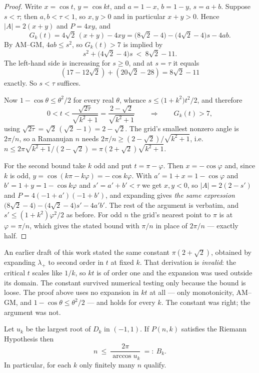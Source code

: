 \begin{proof}
Write $x=\cos t$, $y=\cos kt$, and $a=1-x$, $b=1-y$, $s=a+b$. Suppose
$s<\tau$; then $a,b<\tau<1$, so $x,y>0$ and in particular $x+y>0$. Hence
$|A|=2(x+y)$ and $P=4xy$, and
\[
  G_k(t)=4\sqrt2\,(x+y)-4xy
        =\bigl(8\sqrt2-4\bigr)-\bigl(4\sqrt2-4\bigr)s-4ab .
\]
By AM--GM, $4ab\le s^2$, so $G_k(t)>7$ is implied by
\[
  s^2+\bigl(4\sqrt2-4\bigr)s\ <\ 8\sqrt2-11 .
\]
The left-hand side is increasing for $s\ge0$, and at $s=\tau$ it equals
\[
  (17-12\sqrt2)+(20\sqrt2-28)=8\sqrt2-11
\]
exactly. So $s<\tau$ suffices.

Now $1-\cos\theta\le\theta^2/2$ for every real $\theta$, whence
$s\le\bigl(1+k^2\bigr)t^2/2$, and therefore
\[
  0<t<\frac{\sqrt{2\tau}}{\sqrt{k^2+1}}=\frac{2-\sqrt2}{\sqrt{k^2+1}}
  \qquad\Longrightarrow\qquad G_k(t)>7,
\]
using $\sqrt{2\tau}=\sqrt{2}\,(\sqrt2-1)=2-\sqrt2$. The grid's smallest nonzero
angle is $2\pi/n$, so a Ramanujan $n$ needs
$2\pi/n\ge(2-\sqrt2)/\sqrt{k^2+1}$, i.e.\ $n\le2\pi\sqrt{k^2+1}/(2-\sqrt2)
=\pi(2+\sqrt2)\sqrt{k^2+1}$.

For the second bound take $k$ odd and put $t=\pi-\varphi$. Then $x=-\cos\varphi$
and, since $k$ is odd, $y=\cos(k\pi-k\varphi)=-\cos k\varphi$. With
$a'=1+x=1-\cos\varphi$ and $b'=1+y=1-\cos k\varphi$ and $s'=a'+b'<\tau$ we get
$x,y<0$, so $|A|=2(2-s')$ and $P=4(-1+a')(-1+b')$, and expanding gives
\emph{the same expression}
$\bigl(8\sqrt2-4\bigr)-\bigl(4\sqrt2-4\bigr)s'-4a'b'$. The rest of the argument
is verbatim, and $s'\le(1+k^2)\varphi^2/2$ as before. For odd $n$ the grid's
nearest point to $\pi$ is at $\varphi=\pi/n$, which gives the stated bound with
$\pi/n$ in place of $2\pi/n$ --- exactly half.
\end{proof}

\begin{remark}
An earlier draft of this work stated the same constant $\pi(2+\sqrt2)$, obtained
by expanding $\lambda_+$ to second order in $t$ at fixed $k$. That derivation is
\emph{invalid}: the critical $t$ scales like $1/k$, so $kt$ is of order one and
the expansion was used outside its domain. The constant survived numerical
testing only because the bound is loose. The proof above uses no expansion in
$kt$ at all --- only monotonicity, AM--GM, and $1-\cos\theta\le\theta^2/2$ ---
and holds for every $k$. The constant was right; the argument was not.
\end{remark}

\begin{theorem}[Finiteness]\label{thm:finite}
Let $u_k$ be the largest root of $D_k$ in $(-1,1)$. If $P(n,k)$ satisfies the
Riemann Hypothesis then
\[
  n\ \le\ \frac{2\pi}{\arccos u_k}\ =:\ B_k .
\]
In particular, for each $k$ only finitely many $n$ qualify.
\end{theorem}

